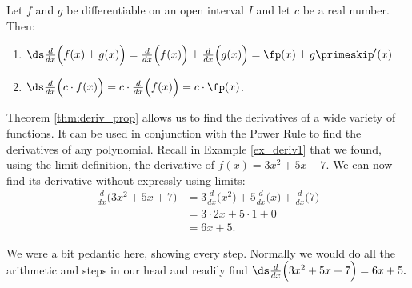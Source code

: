 {Let $f$ and $g$ be differentiable on an open interval $I$ and let $c$ be a real number. Then:
	\begin{enumerate}
	\item	{}
	
	$\ds \frac{d}{dx}\Big(f(x) \pm g(x)\Big) = \frac{d}{dx}\Big(f(x)\Big) \pm \frac{d}{dx}\Big(g(x)\Big)=\fp(x)\pm g\primeskip'(x)$
	\item		{}
	
	$\ds \frac{d}{dx}\Big(c\cdot f(x)\Big) = c\cdot\frac{d}{dx}\Big(f(x)\Big) = c\cdot\fp(x)$.
	\end{enumerate}
}


Theorem \ref{thm:deriv_prop} allows us to find the derivatives of a wide variety of functions. It can be used in conjunction with the Power Rule to find the derivatives of any polynomial. Recall in Example \ref{ex_deriv1} that we found, using the limit definition, the derivative of $f(x) = 3x^2+5x-7$. We can now find its derivative without expressly using limits:
		\begin{align*}
		\frac{d}{dx}\Big(3x^2+5x+7\Big) &= 3\frac{d}{dx}\Big(x^2\Big) + 5\frac{d}{dx}\Big(x\Big) + \frac{d}{dx}\Big(7\Big) \\
																		&= 3\cdot 2x+5\cdot 1+ 0\\
																		&= 6x+5.
		\end{align*}

We were a bit pedantic here, showing every step. Normally we would do all the arithmetic and steps in our head and readily find $\ds \frac{d}{dx}\Big(3x^2+5x+7\Big) = 6x+5.$\\

